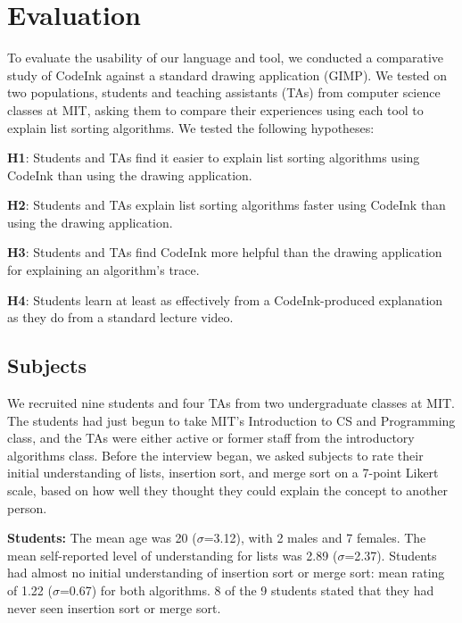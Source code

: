 \section{Evaluation}

To evaluate the usability of our language and tool, we conducted a
comparative study of CodeInk against a standard drawing application
(GIMP). We tested on two populations, students and teaching assistants
(TAs) from computer science classes at MIT, asking them to compare their
experiences using each tool to explain list sorting algorithms. We
tested the following hypotheses:


\noindent \textbf{H1}: Students and TAs find it easier to explain list sorting
algorithms using CodeInk than using the drawing application.

\noindent \textbf{H2}: Students and TAs explain list sorting algorithms
faster using CodeInk than using the drawing application.

\noindent \textbf{H3}: Students and TAs find CodeInk more helpful than
the drawing application for explaining an algorithm's trace.

\noindent \textbf{H4}: Students learn at least as effectively from a
CodeInk-produced explanation as they do from a standard lecture video.

\subsection{Subjects}
We recruited nine students and four TAs from two undergraduate classes at MIT.
The students had just begun to take MIT's Introduction to CS and Programming
class, and the TAs were either active or former staff from the introductory
algorithms class. Before the interview began, we asked subjects to rate their
initial understanding of lists, insertion sort, and merge sort on a 7-point Likert
scale, based on how well they thought they could explain the concept to another
person.

\noindent \textbf{Students:} The mean age was 20 ($\sigma$=3.12), with 2 males
and 7 females. The mean self-reported level of understanding for lists was 2.89
($\sigma$=2.37). Students had almost no initial understanding of insertion sort
or merge sort: mean rating of 1.22 ($\sigma$=0.67) for both algorithms. 8 of the
9 students stated that they had never seen insertion sort or merge sort.

